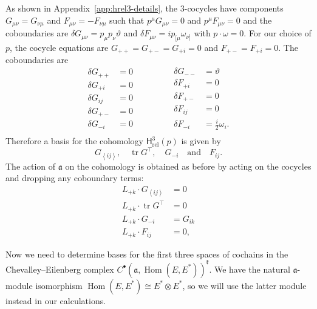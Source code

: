 \documentclass[11pt,reqno,a4paper,final]{amsart}
\theoremstyle{plain}
\theoremstyle{definition}
\newcommand{\fa}{\mathfrak{a}}
\newcommand{\fk}{\mathfrak{k}}
\newcommand{\Hrel}{\mathsf{H}_{\mathrm{rel}}}
\newcommand{\tr}{\operatorname{tr}}
\newcommand{\1}{\mathbb{1}}
\newcommand{\Hom}{\operatorname{Hom}}
\numberwithin{equation}{section}
\begin{document}
\begin{appendices}

As shown in Appendix~\ref{app:hrel3-details}, the $3$-cocycles have
components $G_{\mu\nu} = G_{\nu\mu}$ and $F_{\mu\nu} = - F_{\nu\mu}$
such that $p^\mu G_{\mu\nu} =0$ and $p^\mu F_{\mu\nu}= 0$ and the
coboundaries are $\delta G_{\mu\nu} = p_\mu p_\nu \vartheta$ and
$\delta F_{\mu\nu} = i p_{[\mu} \omega_{\nu]}$ with
$p \cdot \omega = 0$.  For our choice of $p$, the cocycle equations
are $G_{++} = G_{+-} = G_{+i} =0$ and $F_{+-} = F_{+i} = 0$.  The
coboundaries are
\begin{equation}
  \begin{aligned}
    \delta G_{++} &= 0\\
    \delta G_{+i} &= 0\\
    \delta G_{ij} &= 0\\
    \delta G_{+-} &= 0\\
    \delta G_{-i} &= 0\\
  \end{aligned}
  \qquad\qquad
  \begin{aligned}
    \delta G_{--} &= \vartheta\\
    \delta F_{+i} &= 0\\
    \delta F_{+-} &= 0\\
    \delta F_{ij} &= 0\\
    \delta F_{-i} &= \tfrac i2 \omega_i.\\
  \end{aligned}
\end{equation}
Therefore a basis for the cohomology $\Hrel^3(p)$ is given by
\begin{equation}
  G_{\left<ij\right>}, \quad \tr G^ \top, \quad G_{-i} \quad\text{and}\quad F_{ij}.
\end{equation}
The action of $\fa$ on the cohomology is obtained as before by acting
on the cocycles and dropping any coboundary terms:
\begin{equation}
  \begin{split}
    L_{+k} \cdot G _{\left<ij\right>} &= 0\\
    L_{+k} \cdot \tr G^\top &= 0\\
    L_{+k} \cdot G_{-i} & = G_{ik}\\
    L_{+k} \cdot F_{ij} &= 0,
  \end{split}
\end{equation}

Now we need to determine bases for the first three spaces of cochains
in the Chevalley--Eilenberg complex $C^\bullet(\fa, \Hom(E, E^*))^{\fk}$.
We have the natural $\fa$-module isomorphism $\Hom(E,E^*) \cong E^*
\otimes E^*$, so we will use the latter module instead in our
calculations.


\end{appendices}
\end{document}
